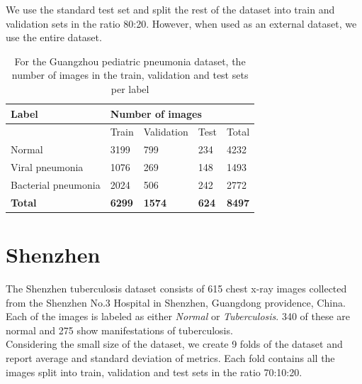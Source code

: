 \documentclass[12pt,oneside,a4paper]{report}
\begin{document}
We use the standard test set and split the rest of the dataset into train and
validation sets in the ratio 80:20.
However, when used as an external dataset, we use the entire dataset.\\

\begin{table}[]
  \centering
  \begin{tabular}{@{}lllll@{}}
    \toprule
    \textbf{Label}      & \multicolumn{4}{l}{\textbf{Number of images}}  \\ \midrule
                        & Train     & Validation & Test      & Total     \\ \midrule
    Normal              & 3199      & 799        & 234       & 4232           \\ \midrule
    Viral pneumonia     & 1076      & 269        & 148       & 1493          \\ \midrule
    Bacterial pneumonia & 2024      & 506        & 242       & 2772          \\ \midrule
    \textbf{Total}      & \textbf{6299} & \textbf{1574}  & \textbf{624} & \textbf{8497} \\ \bottomrule
  \end{tabular}
  \caption{For the Guangzhou pediatric pneumonia dataset, the number of images
    in the train, validation and test sets per label}
  \label{tab:guangzhou_split}
\end{table}

\section{Shenzhen\label{shenzhen}}
The Shenzhen tuberculosis dataset consists of 615 chest x-ray images collected
from the Shenzhen No.3 Hospital in Shenzhen, Guangdong providence, China. Each
of the images is labeled as either \emph{Normal} or \emph{Tuberculosis}. 340 of
these are normal and 275 show manifestations of tuberculosis.\\

Considering the small size of the dataset, we create 9 folds of the dataset and
report average and standard deviation of metrics. Each fold contains all the
images split into train, validation and test sets in the ratio 70:10:20.\\
\end{document}

